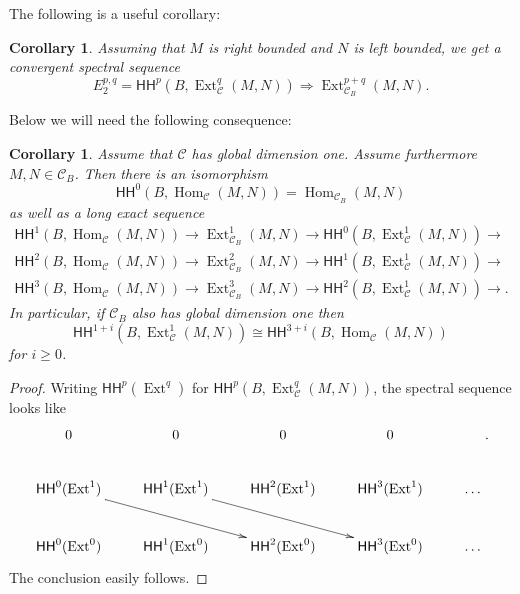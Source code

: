 \documentclass{amsart}
\numberwithin{equation}{section}
\let\cal\mathcal
\newtheorem{corollary}[lemma]{Corollary}
\theoremstyle{definition}
\theoremstyle{remark}
\begin{document}
The following is a useful corollary:
\begin{corollary}
\label{cor:cor1}
Assuming that $M$ is right bounded and $N$ is left bounded, we get a convergent spectral sequence
\[
E_2^{p,q}= {\mathsf{HH}}^p(B,{\operatorname {Ext}}^q_{{\cal C}}(M,N))\Rightarrow {\operatorname {Ext}}^{p+q}_{{{\cal C}}_B}(M,N).
\]
\end{corollary}
Below we will need the following consequence:
\begin{corollary}
\label{cor:cor2}
 Assume that  ${{\cal C}}$ has global dimension
one. Assume furthermore $M,N\in {{\cal C}}_B$. Then there is an isomorphism
\[
{\mathsf{HH}}^0(B,{\operatorname {Hom}}_{{\cal C}}(M,N))={\operatorname {Hom}}_{{{\cal C}}_B}(M,N)
\]
as well as a long
exact sequence
\[
\begin{gathered}
{\mathsf{HH}}^1(B,{\operatorname {Hom}}_{{\cal C}}(M,N)){\rightarrow} {\operatorname {Ext}}^1_{{{\cal C}}_B}(M,N){\rightarrow} {\mathsf{HH}}^0(B,{\operatorname {Ext}}^1_{{\cal C}}(M,N))
{\rightarrow}
\\
{\mathsf{HH}}^2(B,{\operatorname {Hom}}_{{\cal C}}(M,N)){\rightarrow} {\operatorname {Ext}}^2_{{{\cal C}}_B}(M,N){\rightarrow} {\mathsf{HH}}^1(B,{\operatorname {Ext}}^1_{{\cal C}}(M,N))
{\rightarrow}\\
{\mathsf{HH}}^3(B,{\operatorname {Hom}}_{{\cal C}}(M,N)){\rightarrow} {\operatorname {Ext}}^3_{{{\cal C}}_B}(M,N){\rightarrow} {\mathsf{HH}}^2(B,{\operatorname {Ext}}^1_{{\cal C}}(M,N))
{\rightarrow}.
\end{gathered}
\]
In particular, if ${{\cal C}}_B$ also has global dimension one then
\begin{equation}
\label{ref-4.3-24}
{\mathsf{HH}}^{1+i}(B,{\operatorname {Ext}}^1_{{\cal C}}(M,N))
\cong
{\mathsf{HH}}^{3+i}(B,{\operatorname {Hom}}_{{\cal C}}(M,N))
\end{equation}
for $i\ge 0$.
\end{corollary}
\begin{proof} Writing ${\mathsf{HH}}^p({\operatorname {Ext}}^q)$ for ${\mathsf{HH}}^p(B,{\operatorname {Ext}}^q_{{\cal C}}(M,N))$, the spectral sequence
looks like
\[
\xymatrix{
0&0&0&0\\
{\mathsf{HH}}^0({\operatorname {Ext}}^1)\ar[rrd] & {\mathsf{HH}}^1({\operatorname {Ext}}^1)\ar[rrd] & {\mathsf{HH}}^2({\operatorname {Ext}}^1) & {\mathsf{HH}}^3({\operatorname {Ext}}^1) & \dots\\
{\mathsf{HH}}^0({\operatorname {Ext}}^0) & {\mathsf{HH}}^1({\operatorname {Ext}}^0) & {\mathsf{HH}}^2({\operatorname {Ext}}^0) & {\mathsf{HH}}^3({\operatorname {Ext}}^0) & \dots\\
}.
\]
The conclusion easily follows.
\end{proof}
\end{document}

